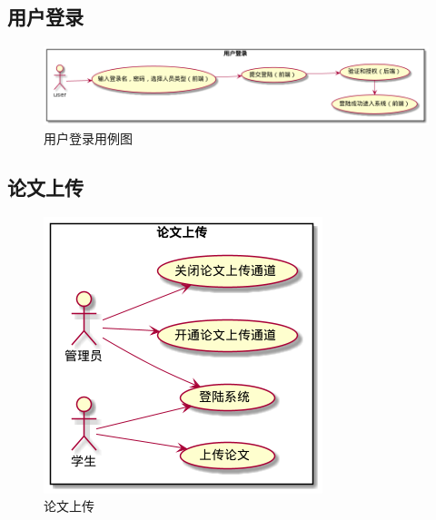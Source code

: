 \subsection{用户登录}

\begin{figure}[h]
	\centering
	\includegraphics[scale = 0.5]{out/uml/用例图/1-用户登录用例图/1-用户登录用例图.png}
	\caption{\song\wuhao 用户登录用例图}
\end{figure}

\subsection{论文上传}

\begin{figure}[h]
	\centering
	\includegraphics[scale = 0.6]{out/uml/用例图/2-论文上传/2-论文上传.png}
	\caption{\song\wuhao 论文上传}
\end{figure}
